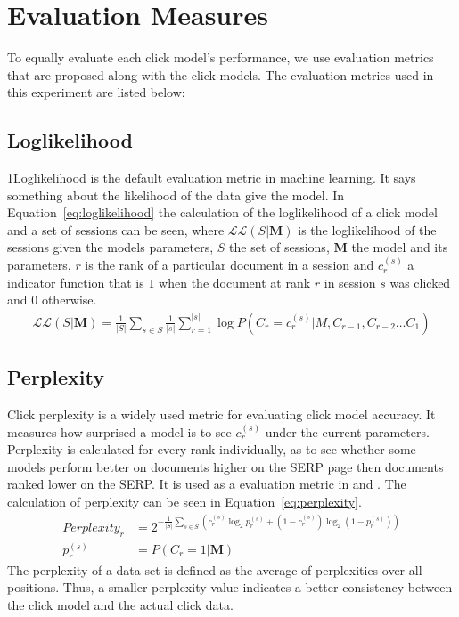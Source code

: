 \section{Evaluation Measures}
\label{sec:evaluation}
To equally evaluate each click model's performance, we use evaluation metrics that are proposed along with the click models. The evaluation metrics used in this experiment are listed below:

\subsection{Loglikelihood}
1Loglikelihood is the default evaluation metric in machine learning. It says something about the likelihood of the data give the model. In Equation~\ref{eq:loglikelihood} the calculation of the loglikelihood of a click model and a set of sessions can be seen, where $\mathcal{L}\mathcal{L}(S|\mathbf{M})$ is the loglikelihood of the sessions given the models parameters, $S$ the set of sessions, $\mathbf{M}$ the model and its parameters, $r$ is the rank of a particular document in a session and $c_r^{(s)}$ a indicator function that is $1$ when the document at rank $r$ in session $s$ was clicked and $0$ otherwise.
\begin{align}
	\mathcal{L}\mathcal{L}(S|\mathbf{M}) = \frac{1}{|S|}\sum_{s \in S} \frac{1}{|s|} \sum_{r = 1}^{|s|} \log P(C_r=c_r^{(s)}|M, C_{r-1}, C_{r-2}\dots C_1)
	\label{eq:loglikelihood}
\end{align}


\subsection{Perplexity}
Click perplexity is a widely used metric for evaluating click model accuracy. It measures how surprised a model is to see $c_r^{(s)}$ under the current parameters. Perplexity is calculated for every rank individually, as to see whether some models perform better on documents higher on the SERP page then documents ranked lower on the SERP. It is used as a evaluation metric in \cite{Zhang2011} and \cite{Dupret2008}. The calculation of perplexity can be seen in Equation~\ref{eq:perplexity}.
\begin{align}
	Perplexity_r &= 2^{-\frac{1}{|S|} \sum_{s \in S}(c_r^{(s)} \log_2 p_r^{(s)} + (1-c_r^{(s)} ) \log_2 (1-p_r^{(s)}))} \label{eq:perplexity} \\
	p_r^{(s)} &= P(C_r = 1 | \mathbf{M}) \nonumber
\end{align}
The perplexity of a data set is defined as the average of perplexities over all positions. Thus, a smaller perplexity value indicates a better consistency between the click model and the actual click data.

